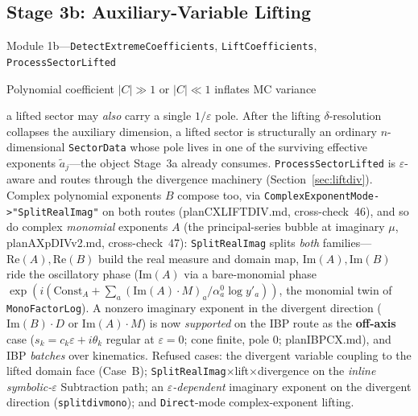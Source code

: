 \documentclass[11pt,a4paper]{article}
\begin{document}
\subsection{Stage 3b: Auxiliary-Variable Lifting}
\begin{description}[style=nextline]
  \item[Source:] Module 1b---\texttt{DetectExtremeCoefficients}, \texttt{LiftCoefficients}, \texttt{ProcessSectorLifted}
  \item[When:] Polynomial coefficient $|C| \gg 1$ or $|C| \ll 1$ inflates MC variance
  \item[Composes with divergence (Case A):] a lifted sector may \emph{also} carry a single $1/\varepsilon$ pole. After the lifting $\delta$-resolution collapses the auxiliary dimension, a lifted sector is structurally an ordinary $n$-dimensional \texttt{SectorData} whose pole lives in one of the surviving effective exponents $\tilde a_j$---the object Stage~3a already consumes. \texttt{ProcessSectorLifted} is $\varepsilon$-aware and routes through the divergence machinery (Section~\ref{sec:liftdiv}). Complex polynomial exponents $B$ compose too, via \texttt{ComplexExponentMode->"SplitRealImag"} on both routes (planCXLIFTDIV.md, cross-check~46), and so do complex \emph{monomial} exponents $A$ (the principal-series bubble at imaginary $\mu$, planAXpDIVv2.md, cross-check~47): \texttt{SplitRealImag} splits \emph{both} families---$\mathrm{Re}(A),\mathrm{Re}(B)$ build the real measure and domain map, $\mathrm{Im}(A),\mathrm{Im}(B)$ ride the oscillatory phase ($\mathrm{Im}(A)$ via a bare-monomial phase $\exp(i(\mathrm{Const}_A+\sum_a (\mathrm{Im}(A)\!\cdot\!M)_a/\alpha^0_a \log y'_a))$, the monomial twin of \texttt{MonoFactorLog}). A nonzero imaginary exponent in the divergent direction ($\mathrm{Im}(B)\!\cdot\!D$ or $\mathrm{Im}(A)\!\cdot\!M$) is now \emph{supported} on the IBP route as the \textbf{off-axis} case ($s_k=c_k\varepsilon+i\theta_k$ regular at $\varepsilon=0$; cone finite, pole $0$; planIBPCX.md), and IBP \emph{batches} over kinematics. Refused cases: the divergent variable coupling to the lifted domain face (Case~B); \texttt{SplitRealImag}$\times$lift$\times$divergence on the \emph{inline symbolic-}$\varepsilon$ Subtraction path; an \emph{$\varepsilon$-dependent} imaginary exponent on the divergent direction (\texttt{splitdivmono}); and \texttt{Direct}-mode complex-exponent lifting.
\end{description}
\end{document}
